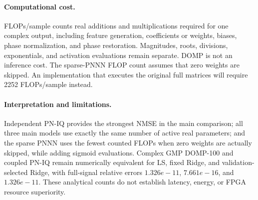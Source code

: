\documentclass[10pt]{article}
\begin{document}
\paragraph{Computational cost.} FLOPs/sample counts real additions and multiplications required for one complex output, including feature generation, coefficients or weights, biases, phase normalization, and phase restoration. Magnitudes, roots, divisions, exponentials, and activation evaluations remain separate. DOMP is not an inference cost. The sparse-PNNN FLOP count assumes that zero weights are skipped. An implementation that executes the original full matrices will require 2252 FLOPs/sample instead.
\paragraph{Interpretation and limitations.} Independent PN-IQ provides the strongest NMSE in the main comparison; all three main models use exactly the same number of active real parameters; and the sparse PNNN uses the fewest counted FLOPs when zero weights are actually skipped, while adding sigmoid evaluations. Complex GMP DOMP-100 and coupled PN-IQ remain numerically equivalent for LS, fixed Ridge, and validation-selected Ridge, with full-signal relative errors $1.326e-11$, $7.661e-16$, and $1.326e-11$. These analytical counts do not establish latency, energy, or FPGA resource superiority.
\end{document}
